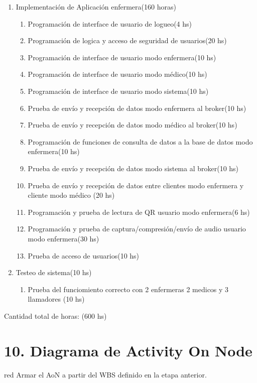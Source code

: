 \documentclass[
11pt, %
]{charter}
\begin{document}
\begin{enumerate}
\item Implementación de Aplicación enfermera(160 horas)
	\begin{enumerate}
	\item Programación de interface de usuario de logueo(4 hs)
	\item Programación de logica y acceso de seguridad de usuarios(20 hs)
	\item Programación de interface de usuario modo enfermera(10 hs)
	\item Programación de interface de usuario modo médico(10 hs)
	\item Programación de interface de usuario modo sistema(10 hs)
	\item Prueba de envío y recepción de datos modo enfermera al broker(10 hs)
	\item Prueba de envío y recepción de datos modo médico al broker(10 hs)
	\item Programación de funciones de consulta de datos a la base de datos modo enfermera(10 hs)
	\item Prueba de envío y recepción de datos modo sistema al broker(10 hs)
	\item Prueba de envío y recepción de datos entre clientes modo enfermera y cliente modo médico (20 hs)
	\item Programación y prueba de lectura de QR usuario modo enfermera(6 hs)
	\item Programación y prueba de captura/compresión/envío de audio usuario modo enfermera(30 hs)
	\item Prueba de acceso de usuarios(10 hs)
	\end{enumerate}
\item Testeo de sistema(10 hs)
	\begin{enumerate}	
	\item Prueba del funciomiento correcto con 2 enfermeras 2 medicos y 3 llamadores  (10 hs)
	\end{enumerate}	
\end{enumerate}

Cantidad total de horas: (600 hs)



\section{10. Diagrama de Activity On Node}
\label{sec:AoN}

\begin{consigna}{red}
Armar el AoN a partir del WBS definido en la etapa anterior. 



\end{consigna}
\end{document}
